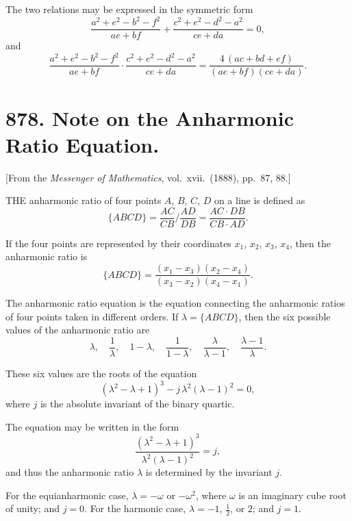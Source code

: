 \documentclass[12pt,a4paper]{article}
\theoremstyle{plain}
\begin{document}
\medskip\noindent
The two relations may be expressed in the symmetric form
\[
\frac{a^{2} + e^{2} - b^{2} - f^{2}}{ae + bf} + \frac{c^{2} + e^{2} - d^{2} - a^{2}}{ce + da} = 0,
\]
and
\[
\frac{a^{2} + e^{2} - b^{2} - f^{2}}{ae + bf} \cdot \frac{c^{2} + e^{2} - d^{2} - a^{2}}{ce + da} = \frac{4\,(ac + bd + ef)}{(ae + bf)(ce + da)}.
\]

\newpage
\section[878]{878. Note on the Anharmonic Ratio Equation.}
\label{sec:878}

[From the \textit{Messenger of Mathematics}, vol.\ xvii.\ (1888), pp.\ 87, 88.]

\medskip\noindent
THE anharmonic ratio of four points $A$, $B$, $C$, $D$ on a line is defined as
\[
\{ABCD\} = \frac{AC}{CB} \bigg/ \frac{AD}{DB} = \frac{AC \cdot DB}{CB \cdot AD}.
\]

If the four points are represented by their coordinates $x_{1}$, $x_{2}$, $x_{3}$, $x_{4}$, then the anharmonic ratio is
\[
\{ABCD\} = \frac{(x_{1} - x_{3})(x_{2} - x_{4})}{(x_{3} - x_{2})(x_{4} - x_{1})}.
\]

The anharmonic ratio equation is the equation connecting the anharmonic ratios of four points taken in different orders. If $\lambda = \{ABCD\}$, then the six possible values of the anharmonic ratio are
\[
\lambda, \quad \frac{1}{\lambda}, \quad 1 - \lambda, \quad \frac{1}{1 - \lambda}, \quad \frac{\lambda}{\lambda - 1}, \quad \frac{\lambda - 1}{\lambda}.
\]

These six values are the roots of the equation
\[
(\lambda^{2} - \lambda + 1)^{3} - j\,\lambda^{2}(\lambda - 1)^{2} = 0,
\]
where $j$ is the absolute invariant of the binary quartic.

\medskip\noindent
The equation may be written in the form
\[
\frac{(\lambda^{2} - \lambda + 1)^{3}}{\lambda^{2}(\lambda - 1)^{2}} = j,
\]
and thus the anharmonic ratio $\lambda$ is determined by the invariant $j$.

\medskip\noindent
For the equianharmonic case, $\lambda = -\omega$ or $-\omega^{2}$, where $\omega$ is an imaginary cube root of unity; and $j = 0$. For the harmonic case, $\lambda = -1$, $\tfrac{1}{2}$, or $2$; and $j = 1$.

\newpage
\end{document}
